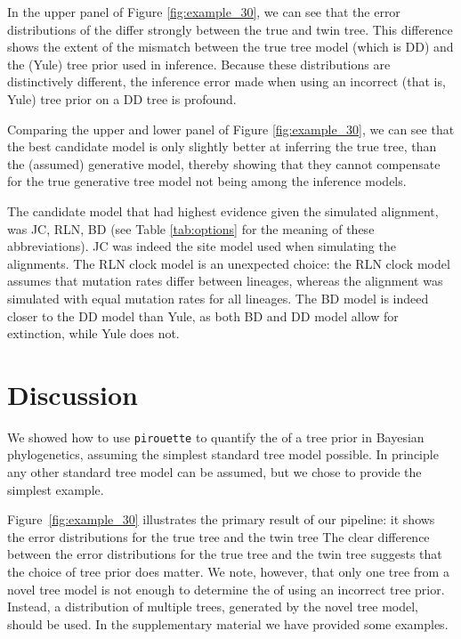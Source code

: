 In the upper panel of Figure \ref{fig:example_30},
we can see that the error distributions of the 
differ strongly between the true and twin tree. 
This difference shows the extent of the mismatch between
the true tree model (which is DD) and the (Yule) tree prior used in inference.
Because these distributions are distinctively different,
the inference error made when using an 
incorrect (that is, Yule) tree prior on a DD tree
is profound.

Comparing the upper and lower panel of Figure \ref{fig:example_30}, 
we can see that the best
candidate model is only slightly better at inferring the true tree,
than the (assumed) generative model, 
thereby showing that they cannot compensate 
for the true generative tree model not being among the inference models.

The candidate model that had highest evidence given the simulated alignment,
was JC, RLN, BD (see Table \ref{tab:options} for the meaning of these 
abbreviations). JC was indeed the site model used when simulating the
alignments. The RLN clock model is an unexpected choice: the RLN clock
model assumes that mutation rates differ between lineages, whereas the
alignment was simulated with equal mutation rates for all lineages.
The BD model is indeed closer to the DD model than Yule, as both BD and DD
model allow for extinction, while Yule does not.

\section{Discussion}

We showed how to use \verb;pirouette; to quantify the  of a 
tree prior in Bayesian phylogenetics, assuming the simplest standard 
tree model possible.
In principle any other standard tree model can be assumed, 
but we chose to provide the simplest example.

Figure~\ref{fig:example_30} illustrates the primary result of our pipeline: 
it shows the error distributions for the true tree and the twin tree  
The clear difference between the error distributions 
for the true tree and the twin tree suggests 
that the choice of tree prior does matter.
We note, however, that only one tree from a novel tree model
is not enough to determine the  of using an incorrect
tree prior. Instead, a distribution 
of multiple trees, generated by the novel tree model, should be used. In the supplementary material we have provided some examples.

